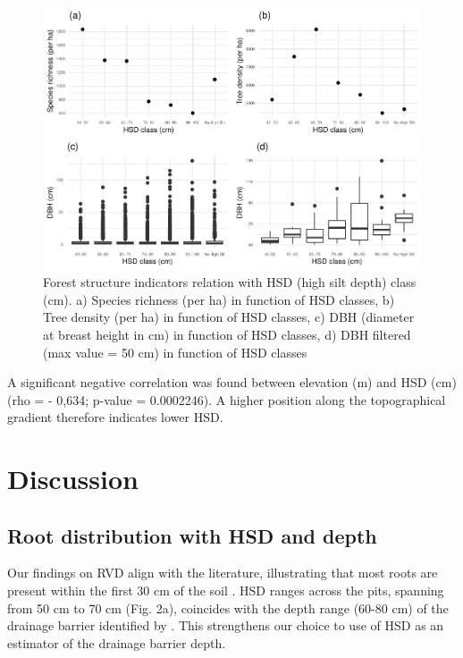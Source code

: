 \documentclass[fleqn,11pt]{latex/stylish_article} %
\begin{document}
\scriptsize

\begin{figure}

{\centering \includegraphics[width=0.8\linewidth,]{pedoP16-report_files/figure-latex/auger-1} 

}

\caption{Forest structure indicators relation with HSD (high silt depth) class (cm). a) Species richness (per ha) in function of HSD classes, b) Tree density (per ha) in function of HSD classes, c) DBH (diameter at breast height in cm) in function of HSD classes, d) DBH filtered (max value = 50 cm) in function of HSD classes}\label{fig:auger}
\end{figure}

\normalsize

A significant negative correlation was found between elevation (m) and HSD (cm) (rho = - 0,634; p-value = 0.0002246). A higher position along the topographical gradient therefore indicates lower HSD.

\hypertarget{discussion}{%
\section{Discussion}\label{discussion}}

\hypertarget{root-distribution-with-hsd-and-depth}{%
\subsection{Root distribution with HSD and depth}\label{root-distribution-with-hsd-and-depth}}

Our findings on RVD align with the literature, illustrating that most roots are present within the first 30 cm of the soil \citep{freschetStartingGuideRoot2021, schenkGlobalBiogeographyRoots2002}. HSD ranges across the pits, spanning from 50 cm to 70 cm (Fig. 2a), coincides with the depth range (60-80 cm) of the drainage barrier identified by \citet{epronSpatialVariationSoil2006}. This strengthens our choice to use of HSD as an estimator of the drainage barrier depth.
\end{document}
